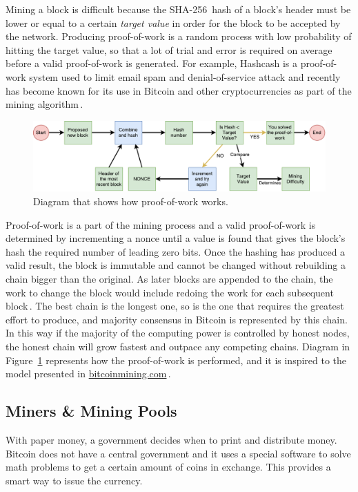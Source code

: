 \documentclass[USenglish]{uit-thesis}
\begin{document}
Mining a block is difficult because the SHA-256\,\cite{sha} hash of a block's header
must be lower or equal to a certain \emph{target value} in order for the
block to be accepted by the network.
Producing proof-of-work is a random process with low probability
of hitting the target value,
so that a lot of trial and error is required on average before a valid
proof-of-work is generated. For example, Hashcash is a
proof-of-work system used to limit email spam and
denial-of-service attack and recently has become known
for its use in Bitcoin and other cryptocurrencies as part
of the mining algorithm\,\cite{Back02hashcash}.

\begin{figure}[h]
	\centering
	\includegraphics[width=1\textwidth]{img/proof-of-work-schema}
	\caption{Diagram that shows how proof-of-work works.}
	\label{fig:proof-of-work-schema}
\end{figure}

Proof-of-work is a part of the mining process and a valid
proof-of-work is determined by incrementing
a nonce until a value is found that gives the block's
hash the required number of leading zero bits.
Once the hashing has produced a
valid result, the block is immutable and
cannot be changed without
rebuilding a chain bigger than
the original.
As later blocks are appended to the chain,
the work to change the block would include redoing the work for
each subsequent block\,\cite{bitcoinmining_process}.
The best chain is the longest one, so is the one that requires the greatest
effort to produce, and majority consensus in Bitcoin
is represented by this chain. In this way if the
majority of the computing power
is controlled by honest nodes, the honest
chain will grow fastest and outpace any competing chains.
Diagram in  Figure~\ref{fig:proof-of-work-schema} represents
how the proof-of-work is performed, and it
is inspired to the model presented
in \url{bitcoinmining.com}\,\cite{bitcoinmining}.

\subsection{Miners \& Mining Pools}
\label{sec:miner}
With paper money, a government decides when
to print and distribute money. Bitcoin does not
have a central government and
it uses a special software to solve math problems
to get a certain amount of coins in exchange.
This provides a smart way to issue the currency.
\end{document}
